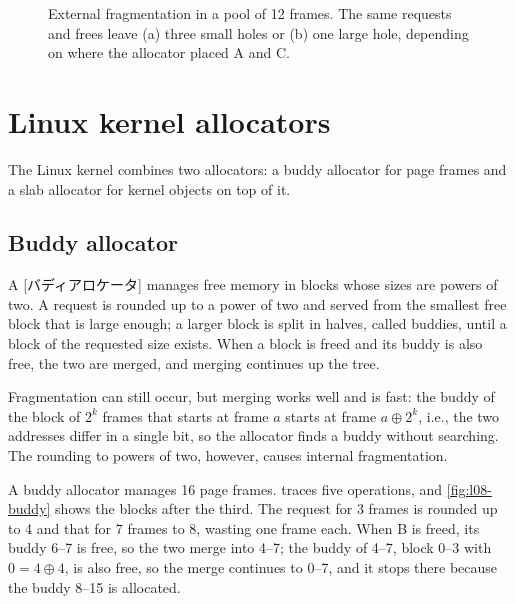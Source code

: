 \documentclass[../main.tex]{subfiles}
\begin{document}
\begin{figure}[htbp]
  \centering
  
  \caption{External fragmentation in a pool of 12 frames.  The same requests
    and frees leave (a) three small holes or (b) one large hole, depending
    on where the allocator placed A and C.}
  \label{fig:l08-fragmentation}
\end{figure}

\section{Linux kernel allocators}
\label{sec:l08-linux-allocators}

The Linux kernel combines two allocators: a buddy allocator for page frames
and a slab allocator for kernel objects on top of it.

\subsection{Buddy allocator}

\begin{definition}
  A [バディアロケータ] manages free memory in blocks
  whose sizes are powers of two.  A request is rounded up to a power of two
  and served from the smallest free block that is large enough; a larger
  block is split in halves, called buddies, until a block of the requested
  size exists.  When a block is freed and its buddy is also free, the two
  are merged, and merging continues up the tree.
\end{definition}

Fragmentation can still occur, but merging works well and is fast: the
buddy of the block of $2^{k}$ frames that starts at frame $a$ starts at
frame $a \oplus 2^{k}$, i.e., the two addresses differ in a single bit, so
the allocator finds a buddy without searching.  The rounding to powers of
two, however, causes internal fragmentation.

\begin{example}
  \label{ex:l08-buddy}
  A buddy allocator manages 16 page frames.   traces
  five operations, and \cref{fig:l08-buddy} shows the blocks after the
  third.  The request for 3 frames is rounded up to 4 and that for 7 frames
  to 8, wasting one frame each.  When B is freed, its buddy 6--7 is free,
  so the two merge into 4--7; the buddy of 4--7, block 0--3 with $0 = 4
  \oplus 4$, is also free, so the merge continues to 0--7, and it stops
  there because the buddy 8--15 is allocated.
\end{example}
\end{document}
